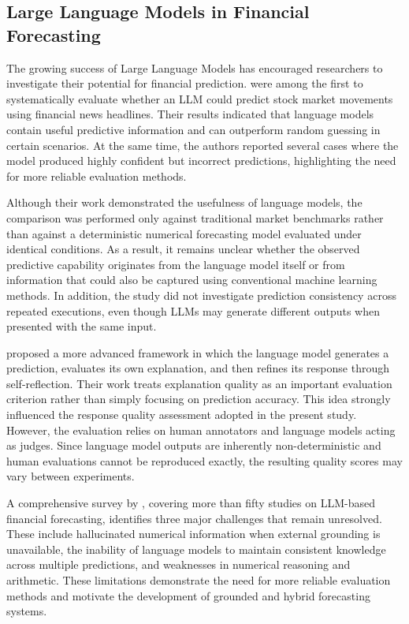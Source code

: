 \subsection{Large Language Models in Financial Forecasting}\label{sec:llm-finance}

The growing success of Large Language Models has encouraged researchers
to investigate their potential for financial prediction. \citet{lopezlira2023} were among the first to systematically evaluate whether an
LLM could predict stock market movements using financial news headlines.
Their results indicated that language models contain useful predictive
information and can outperform random guessing in certain scenarios. At
the same time, the authors reported several cases where the model
produced highly confident but incorrect predictions, highlighting the
need for more reliable evaluation methods.

Although their work demonstrated the usefulness of language models, the
comparison was performed only against traditional market benchmarks
rather than against a deterministic numerical forecasting model
evaluated under identical conditions. As a result, it remains unclear
whether the observed predictive capability originates from the language
model itself or from information that could also be captured using
conventional machine learning methods. In addition, the study did not
investigate prediction consistency across repeated executions, even
though LLMs may generate different outputs when presented with the same
input.

\citet{yu2024} proposed a more advanced framework in which the
language model generates a prediction, evaluates its own explanation,
and then refines its response through self-reflection. Their work treats
explanation quality as an important evaluation criterion rather than
simply focusing on prediction accuracy. This idea strongly influenced
the response quality assessment adopted in the present study. However,
the evaluation relies on human annotators and language models acting as
judges. Since language model outputs are inherently non-deterministic
and human evaluations cannot be reproduced exactly, the resulting
quality scores may vary between experiments.

A comprehensive survey by \citet{nie2024}, covering more than fifty
studies on LLM-based financial forecasting, identifies three major
challenges that remain unresolved. These include hallucinated numerical
information when external grounding is unavailable, the inability of
language models to maintain consistent knowledge across multiple
predictions, and weaknesses in numerical reasoning and arithmetic. These
limitations demonstrate the need for more reliable evaluation methods
and motivate the development of grounded and hybrid forecasting systems.

